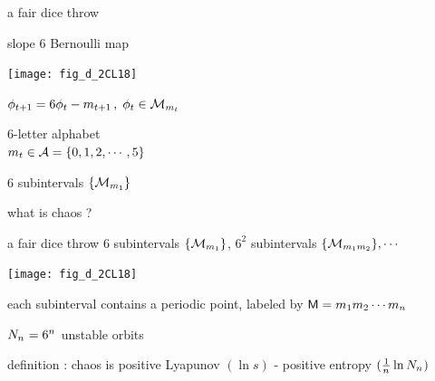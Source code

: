 \renewcommand{\ssp}{\ensuremath{\phi}}             %
\renewcommand{\ssp}{\ensuremath{\phi}}             %
\begin{frame}{a fair dice throw}
    \begin{block}{slope ${6}$ Bernoulli map}
\begin{center}
            \begin{minipage}[c]{0.32\textwidth}\begin{center}
\texttt{[image: fig\_d\_2CL18]}
            \end{center}\end{minipage}
            \hspace{2ex}
            \begin{minipage}[c]{0.46\textwidth}
\(
\ssp_{\zeit+1}
= {6} \ssp_{\zeit} - \Ssym{\zeit+1}
\,,\;  \ssp_{\zeit}\in\pS_{\Ssym{\zeit}}
\)
\medskip

${6}$-letter alphabet \\
\(
{m_{t}} \in \mathcal{A}=\{0,1,2,\cdots,5\}
\)
            \end{minipage}
\end{center}
$6$ subintervals $\{{\cal M}_{{m_{1}}}\}$
    \end{block}
\end{frame}

\begin{frame}{what is chaos ?}
    \begin{block}{a fair dice throw}
$6$ subintervals $\{{\cal M}_{{m_{1}}}\}$,
$6^2$ subintervals $\{{\cal M}_{{m_{1}}{m_{2}}}\}, \cdots$
\begin{center}
            \begin{minipage}[c]{0.32\textwidth}\begin{center}
\texttt{[image: fig\_d\_2CL18]}
            \end{center}\end{minipage}
            \hspace{2ex}
            \begin{minipage}[c]{0.46\textwidth}
each subinterval contains a periodic point,
labeled by
$\mathsf{M}={m_{1}}{m_{2}}\cdots{\ensuremath{m_{{n_{}}}}}$
\bigskip

$N_{n_{}} = 6^{n_{}}$ {\color{red}unstable} orbits
            \end{minipage}
\end{center}
    \end{block}
\vfill
    \begin{block}{definition : chaos is}
positive Lyapunov $(\ln s)$ - positive entropy $(\frac{1}{{n_{}}}\ln N_{n_{}})$
    \end{block}
\end{frame}

